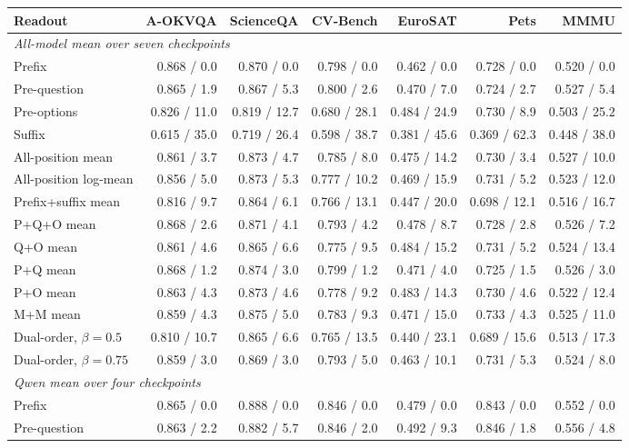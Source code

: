 \begin{tabular}{lrrrrrr}
\toprule
Readout & A-OKVQA & ScienceQA & CV-Bench & EuroSAT & Pets & MMMU \\
\midrule
\multicolumn{7}{l}{\textit{All-model mean over seven checkpoints}} \\
Prefix & 0.868 / 0.0 & 0.870 / 0.0 & 0.798 / 0.0 & 0.462 / 0.0 & 0.728 / 0.0 & 0.520 / 0.0 \\
Pre-question & 0.865 / 1.9 & 0.867 / 5.3 & 0.800 / 2.6 & 0.470 / 7.0 & 0.724 / 2.7 & 0.527 / 5.4 \\
Pre-options & 0.826 / 11.0 & 0.819 / 12.7 & 0.680 / 28.1 & 0.484 / 24.9 & 0.730 / 8.9 & 0.503 / 25.2 \\
Suffix & 0.615 / 35.0 & 0.719 / 26.4 & 0.598 / 38.7 & 0.381 / 45.6 & 0.369 / 62.3 & 0.448 / 38.0 \\
All-position mean & 0.861 / 3.7 & 0.873 / 4.7 & 0.785 / 8.0 & 0.475 / 14.2 & 0.730 / 3.4 & 0.527 / 10.0 \\
All-position log-mean & 0.856 / 5.0 & 0.873 / 5.3 & 0.777 / 10.2 & 0.469 / 15.9 & 0.731 / 5.2 & 0.523 / 12.0 \\
Prefix+suffix mean & 0.816 / 9.7 & 0.864 / 6.1 & 0.766 / 13.1 & 0.447 / 20.0 & 0.698 / 12.1 & 0.516 / 16.7 \\
P+Q+O mean & 0.868 / 2.6 & 0.871 / 4.1 & 0.793 / 4.2 & 0.478 / 8.7 & 0.728 / 2.8 & 0.526 / 7.2 \\
Q+O mean & 0.861 / 4.6 & 0.865 / 6.6 & 0.775 / 9.5 & 0.484 / 15.2 & 0.731 / 5.2 & 0.524 / 13.4 \\
P+Q mean & 0.868 / 1.2 & 0.874 / 3.0 & 0.799 / 1.2 & 0.471 / 4.0 & 0.725 / 1.5 & 0.526 / 3.0 \\
P+O mean & 0.863 / 4.3 & 0.873 / 4.6 & 0.778 / 9.2 & 0.483 / 14.3 & 0.730 / 4.6 & 0.522 / 12.4 \\
M+M mean & 0.859 / 4.3 & 0.875 / 5.0 & 0.783 / 9.3 & 0.471 / 15.0 & 0.733 / 4.3 & 0.525 / 11.0 \\
Dual-order, $\beta{=}0.5$ & 0.810 / 10.7 & 0.865 / 6.6 & 0.765 / 13.5 & 0.440 / 23.1 & 0.689 / 15.6 & 0.513 / 17.3 \\
Dual-order, $\beta{=}0.75$ & 0.859 / 3.0 & 0.869 / 3.0 & 0.793 / 5.0 & 0.463 / 10.1 & 0.731 / 5.3 & 0.524 / 8.0 \\
\midrule
\multicolumn{7}{l}{\textit{Qwen mean over four checkpoints}} \\
Prefix & 0.865 / 0.0 & 0.888 / 0.0 & 0.846 / 0.0 & 0.479 / 0.0 & 0.843 / 0.0 & 0.552 / 0.0 \\
Pre-question & 0.863 / 2.2 & 0.882 / 5.7 & 0.846 / 2.0 & 0.492 / 9.3 & 0.846 / 1.8 & 0.556 / 4.8 \\

\end{tabular}
